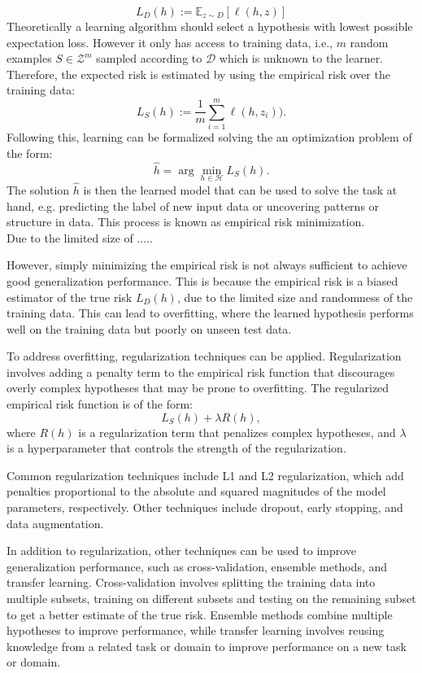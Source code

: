 \begin{equation}
L_{D}(h):=\mathbb{E}_{z\sim D}[\ell(h,z)]
\end{equation}
Theoretically a learning algorithm should select a hypothesis with lowest possible expectation loss. However it only has access to training data, i.e., $m$ random examples $S\in\mathcal{Z}^m$ sampled according to $\mathcal{D}$ which is unknown to the learner. Therefore, the expected risk is estimated by using the empirical risk over the training data:
\begin{equation}
L_{S}(h):=\frac{1}{m}\sum_{i=1}^m\ell(h,z_i)).
\end{equation}
Following this, learning can be formalized solving the an optimization problem of the form: 
\begin{equation}
\hat{h}=\arg\min_{h\in\mathcal{H}}L_{S}(h).
\end{equation}
The solution $\hat{h}$ is then the learned model that can be used to solve the task at hand, e.g. predicting the label of new input data or uncovering patterns or structure in data. This process is known as empirical risk minimization. \\
Due to the limited size of ..... 

However, simply minimizing the empirical risk is not always sufficient to achieve good generalization performance. This is because the empirical risk is a biased estimator of the true risk $L_D(h)$, due to the limited size and randomness of the training data. This can lead to overfitting, where the learned hypothesis performs well on the training data but poorly on unseen test data.

To address overfitting, regularization techniques can be applied. Regularization involves adding a penalty term to the empirical risk function that discourages overly complex hypotheses that may be prone to overfitting. The regularized empirical risk function is of the form:
\begin{equation}
L_S(h)+\lambda R(h),
\end{equation}
where $R(h)$ is a regularization term that penalizes complex hypotheses, and $\lambda$ is a hyperparameter that controls the strength of the regularization.

Common regularization techniques include L1 and L2 regularization, which add penalties proportional to the absolute and squared magnitudes of the model parameters, respectively. Other techniques include dropout, early stopping, and data augmentation.

In addition to regularization, other techniques can be used to improve generalization performance, such as cross-validation, ensemble methods, and transfer learning. Cross-validation involves splitting the training data into multiple subsets, training on different subsets and testing on the remaining subset to get a better estimate of the true risk. Ensemble methods combine multiple hypotheses to improve performance, while transfer learning involves reusing knowledge from a related task or domain to improve performance on a new task or domain.





